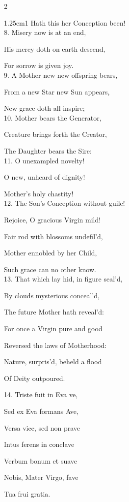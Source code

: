 \begin{multicols}{2}
\begin{hangparas}{1.25em}{1}
Hath this her Conception been!\\

8. Misery now is at an end,

His mercy doth on earth descend,

For sorrow is given joy.\\

9. A Mother new new offspring bears,

From a new Star new Sun appears,

New grace doth all inspire;\\

10. Mother bears the Generator,

Creature brings forth the Creator,

The Daughter bears the Sire:\\

11. O unexampled novelty!

O new, unheard of dignity!

Mother's holy chastity!\\

12. The Son's Conception without guile!

Rejoice, O gracious Virgin mild!

Fair rod with blossoms undefil'd,

Mother ennobled by her Child,

Such grace can no other know.\\

13. That which lay hid, in figure seal'd,

By clouds mysterious conceal'd,

The future Mother hath reveal'd:

For once a Virgin pure and good

Reversed the laws of Motherhood:

Nature, surpris'd, beheld a flood

Of Deity outpoured.\\


14. Triste fuit in Eva ve,

Sed ex Eva formans Ave,

Versa vice, sed non prave

Intus ferens in conclave

Verbum bonum et suave

Nobis, Mater Virgo, fave

Tua frui gratia.\\


\end{hangparas}
\end{multicols}

